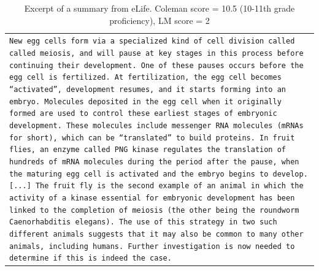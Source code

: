 \begin{table}[!t]
    \centering \footnotesize
    \begin{tabular}{p{}}
        \texttt{New egg cells form via a specialized kind of cell division called called meiosis, and will pause at key stages in this process before continuing their development. One of these pauses occurs before the egg cell is fertilized. At fertilization, the egg cell becomes “activated”, development resumes, and it starts forming into an embryo. 
        Molecules deposited in the egg cell when it originally formed are used to control these earliest stages of embryonic development. These molecules include messenger RNA molecules (mRNAs for short), which can be “translated” to build proteins. In fruit flies, an enzyme called PNG kinase regulates the translation of hundreds of mRNA molecules during the period after the pause, when the maturing egg cell is activated and the embryo begins to develop. 
        [...]
        The fruit fly is the second example of an animal in which the activity of a kinase essential for embryonic development has been linked to the completion of meiosis (the other being the roundworm Caenorhabditis elegans). The use of this strategy in two such different animals suggests that it may also be common to many other animals, including humans. Further investigation is now needed to determine if this is indeed the case.}
    \end{tabular}
    \caption{Excerpt of a summary from eLife. Coleman score = 10.5 (10-11th grade proficiency), LM score = 2}
    \label{tab:disagreement-example2}
\end{table}